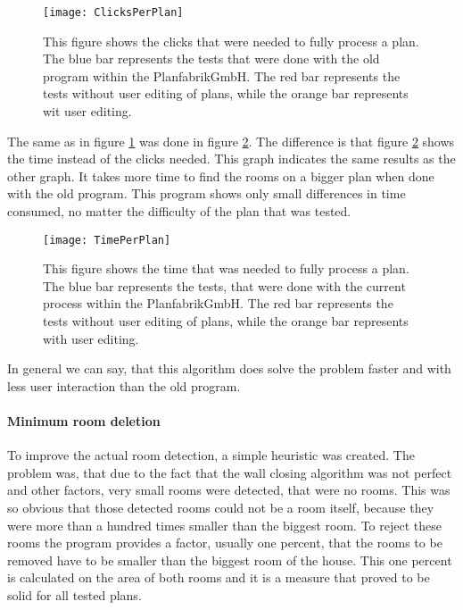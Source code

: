 \begin{figure}[H]
	\centering
	\texttt{[image: ClicksPerPlan]}
	\caption{This figure shows the clicks that were needed to fully process a plan. The blue bar represents the tests that were done with the old program within the PlanfabrikGmbH. The red bar represents the tests without user editing of plans, while the orange bar represents wit user editing.}
	\label{fig:ClicksPerPlan}
\end{figure}

The same as in figure \ref{fig:ClicksPerPlan} was done in figure \ref{fig:TimePerPlan}. The difference is that figure \ref{fig:TimePerPlan} shows the time instead of the clicks needed. This graph indicates the same results as the other graph. It takes more time to find the rooms on a bigger plan when done with the old program. This program shows only small differences in time consumed, no matter the difficulty of the plan that was tested. 

\begin{figure}[H]
	\centering
	\texttt{[image: TimePerPlan]}
	\caption{This figure shows the time that was needed to fully process a plan. The blue bar represents the tests, that were done with the current process within the PlanfabrikGmbH. The red bar represents the tests without user editing of plans, while the orange bar represents with user editing.}
	\label{fig:TimePerPlan}
\end{figure}

In general we can say, that this algorithm does solve the problem faster and with less user interaction than the old program.

\paragraph{Minimum room deletion}
\label{sub:MinimumRoom}
To improve the actual room detection, a simple heuristic was created. The problem was, that due to the fact that the wall closing algorithm was not perfect and other factors, very small rooms were detected, that were no rooms. This was so obvious that those detected rooms could not be a room itself, because they were more than a hundred times smaller than the biggest room.
To reject these rooms the program provides a factor, usually one percent, that the rooms to be removed have to be smaller than the biggest room of the house. This one percent is calculated on the area of both rooms and it is a measure that proved to be solid for all tested plans.


